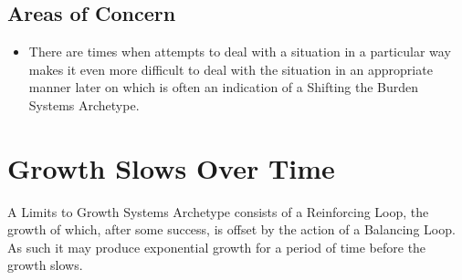 \documentclass[]{memoir}
\begin{document}
\subsection{Areas of Concern}

\begin{itemize}
\itemsep1pt\parskip0pt
\item
  There are times when attempts to deal with a situation in a particular
  way makes it even more difficult to deal with the situation in an
  appropriate manner later on which is often an indication of a Shifting
  the Burden Systems Archetype.
\end{itemize}

\section{Growth Slows Over Time}

A Limits to Growth Systems Archetype consists of a Reinforcing Loop, the
growth of which, after some success, is offset by the action of a
Balancing Loop. As such it may produce exponential growth for a period
of time before the growth slows.

\FloatBarrier 
\end{document}
